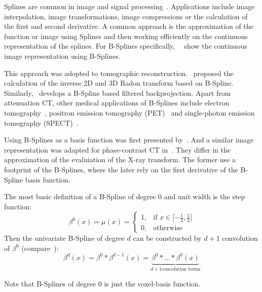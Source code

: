 Splines are common in image and signal processing~\cite{unser_splines_1999}. Applications include
image interpolation, image transformations, image compressions or the calculation of the first and
second derivative. A common approach is the approximation of the function or image using Splines and
then working efficiently on the continuous representation of the splines. For B-Splines
specifically,~\citeauthor{unser_fast_1991}~\cite{unser_fast_1991} show the continuous image
representation using B-Splines.

This approach was adopted to tomographic reconstruction.~\cite{la_riviere_spline-based_1998}
proposed the calculation of the inverse 2D and 3D Radon transform based on B-Spline.
Similarly,~\cite{horbelt_discretization_2002} develops a B-Spline based filtered backprojection.
Apart from attenuation CT, other medical applications of B-Splines include electron
tomography~\cite{tran_robust_2013, tran_inverse_2014}, positron emission tomography
(PET)~\cite{nichols_spatiotemporal_2002, li_fast_2007, verhaeghe_investigation_2007} and
single-photon emission tomography (SPECT)~\cite{guedon_b-spline_1991, reutter_fully_2007}.

Using B-Splines as a basis function was first presented by~\cite{momey_new_2011,
	momey_b-spline_2012, momey_spline_2015}. And a similar image representation was adapted for
phase-contrast CT in~\cite{nilchian_fast_2013, nilchian_differential_2012, nilchian_spline_2015}.
They differ in the approximation of the evaluiation of the X-ray transform. The former use a
footprint of the B-Splines, where the later rely on the first derivative of the B-Spline basis
function.

\begin{definition}[B-Spline]
	The most basic definition of a B-Spline of degree \(0\) and unit width is the step function:
	\begin{equation}
		\beta^0(x) = \mu(x) =
		\begin{cases}
			1, & \text{if } x \in \mathopen[\minus \frac{1}{2}, \frac{1}{2}\mathclose] \\
			0, & \text{otherwise}
		\end{cases}
	\end{equation}
	Then the univariate B-Spline of degree \(d\) can be constructed by \(d + 1\) convolution of \(\beta^0\)
	(compare~\cite{momey_new_2011}):
	\begin{equation}
		\beta^d(x) = \beta^0 * \beta^{d-1}(x) =
		\underbrace{\beta^0 * \dots * \beta^0(x)}_{d+1 \text{concolution terms}}
	\end{equation}
\end{definition}
Note that B-Splines of degree \(0\) is just the voxel-basis function.


